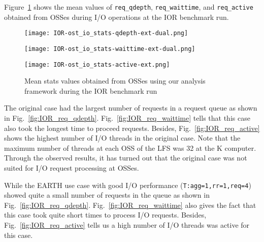 \documentclass{jhps}
\begin{document}
Figure~\ref{fig:IOR_OST_IO_STATS} shows the mean values of
{\tt req\_qdepth}, {\tt req\_waittime}, and {\tt req\_active} obtained from OSSes
during I/O operations at the IOR benchmark run.
%
\begin{figure}[htb]
\centering
\begin{minipage}[t]{0.88\textwidth}
 \centering
 \texttt{[image: IOR-ost\_io\_stats-qdepth-ext-dual.png]}
 \label{fig:IOR_req_qdepth}
\end{minipage}
%
\noindent
\begin{minipage}[t]{0.88\textwidth}
 \centering
 \texttt{[image: IOR-ost\_io\_stats-waittime-ext-dual.png]}
 \label{fig:IOR_req_waittime}
\end{minipage}
%
\noindent
\begin{minipage}[t]{0.4\textwidth}
 \centering
 \texttt{[image: IOR-ost\_io\_stats-active-ext.png]}
 \label{fig:IOR_req_active}
\end{minipage}
%
\caption{Mean stats values obtained from OSSes using our analysis framework
during the IOR benchmark run}
\label{fig:IOR_OST_IO_STATS}
\end{figure}
%
The original case had the largest number of requests in a request queue
as shown in Fig.~\ref{fig:IOR_req_qdepth}.
Fig.~\ref{fig:IOR_req_waittime}
tells that this case also took the longest time to proceed requests.
Besides, Fig.~\ref{fig:IOR_req_active} shows
the highest number of I/O threads in the original case.
Note that the maximum number of threads at each OSS of the LFS was 32
at the K computer.
Through the observed results, it has turned out that the original case was not
suited for I/O request processing at OSSes.

While the EARTH use case with good I/O performance ({\tt T:agg=1,rr=1,req=4})
showed quite a small number of requests in the queue as shown in
Fig.~\ref{fig:IOR_req_qdepth}.
Fig.~\ref{fig:IOR_req_waittime} also gives
the fact that this case took quite short times to process I/O requests.
Besides, Fig.~\ref{fig:IOR_req_active}
tells us a high number of I/O threads was active for this case.
\end{document}
